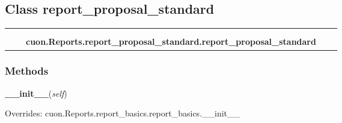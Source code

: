 \subsection{Class report\_proposal\_standard}

    \label{cuon:Reports:report_proposal_standard:report_proposal_standard}
\begin{tabular}{cccccc}
\multicolumn{2}{r}{\settowidth{\BCL}{cuon.Reports.report\_basics.report\_basics}\multirow{2}{\BCL}{cuon.Reports.report\_basics.report\_basics}}
&&
  \\\cline{3-3}
  &&\multicolumn{1}{c|}{}
&&
  \\
&&\multicolumn{2}{l}{\textbf{cuon.Reports.report\_proposal\_standard.report\_proposal\_standard}}
\end{tabular}



  \subsubsection{Methods}

    \vspace{0.5ex}

\hspace{.8\funcindent}\begin{boxedminipage}{\funcwidth}

    \raggedright \textbf{\_\_init\_\_}(\textit{self})

\setlength{\parskip}{2ex}
\setlength{\parskip}{1ex}
      Overrides: cuon.Reports.report\_basics.report\_basics.\_\_init\_\_

    \end{boxedminipage}

    \label{cuon:Reports:report_proposal_standard:report_proposal_standard:getReportData}

    \vspace{0.5ex}

